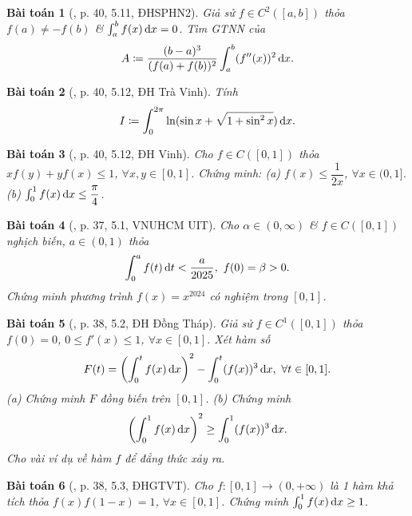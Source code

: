 \documentclass[oneside]{book}
\newtheorem{baitoan}{Bài toán}
\begin{document}
\begin{baitoan}[\cite{VMS_VMC2023}, p. 40, 5.11, ĐHSPHN2]
	Giả sử $f\in C^2([a,b])$ thỏa $f(a)\ne-f(b)$ \& $\int_a^b f(x)\,{\rm d}x = 0$. Tìm {\rm GTNN} của
	\begin{equation*}
		A\coloneqq\frac{(b - a)^3}{(f(a) + f(b))^2}\int_a^b (f''(x))^2\,{\rm d}x.
	\end{equation*}
\end{baitoan}

\begin{baitoan}[\cite{VMS_VMC2023}, p. 40, 5.12, ĐH Trà Vinh]
	Tính
	\begin{equation*}
		I\coloneqq\int_0^{2\pi} \ln(\sin x + \sqrt{1 + \sin^2x})\,{\rm d}x.
	\end{equation*}
\end{baitoan}

\begin{baitoan}[\cite{VMS_VMC2023}, p. 40, 5.12, ĐH Vinh]
	Cho $f\in C([0,1])$ thỏa $xf(y) + yf(x)\le1$, $\forall x,y\in[0,1]$. Chứng minh: (a) $f(x)\le\dfrac{1}{2x}$, $\forall x\in(0,1]$. (b) $\int_0^1 f(x)\,{\rm d}x\le\dfrac{\pi}{4}$.
\end{baitoan}

\begin{baitoan}[\cite{VMS_VMC2024}, p. 37, 5.1, VNUHCM UIT]
	Cho $\alpha\in(0,\infty)$ \& $f\in C([0,1])$ nghịch biến, $a\in(0,1)$ thỏa
	\begin{equation*}
		\int_0^a f(t)\,{\rm d}t < \frac{a}{2025},\ f(0) = \beta > 0.
	\end{equation*}
	Chứng minh phương trình $f(x) = x^{2024}$ có nghiệm trong $[0,1]$.
\end{baitoan}

\begin{baitoan}[\cite{VMS_VMC2024}, p. 38, 5.2, ĐH Đồng Tháp]
	Giả sử $f\in C^1([0,1])$ thỏa $f(0) = 0$, $0\le f'(x)\le1$, $\forall x\in[0,1]$. Xét hàm số
	\begin{equation*}
		F(t) = \left(\int_0^t f(x)\,{\rm d}x\right)^2 - \int_0^t (f(x))^3\,{\rm d}x,\ \forall t\in[0,1].
	\end{equation*}
	(a) Chứng minh $F$ đồng biến trên $[0,1]$. (b) Chứng minh
	\begin{equation*}
		\left(\int_0^1 f(x)\,{\rm d}x\right)^2\ge\int_0^1 (f(x))^3\,{\rm d}x.
	\end{equation*}
	Cho vài ví dụ về hàm $f$ để đẳng thức xảy ra.
\end{baitoan}

\begin{baitoan}[\cite{VMS_VMC2024}, p. 38, 5.3, ĐHGTVT]
	Cho $f:[0,1]\to(0,+\infty)$ là 1 hàm khả tích thỏa $f(x)f(1 - x) = 1$, $\forall x\in[0,1]$. Chứng minh $\int_0^1 f(x)\,{\rm d}x\ge1$.
\end{baitoan}
\end{document}
